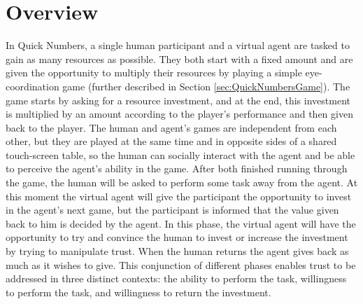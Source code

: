 \section{Overview}
\label{sec:ScenarioOverview}
In Quick Numbers, a single human participant and a virtual agent are tasked to gain as many resources as possible. They both start with a fixed amount and are given the opportunity to multiply their resources by playing a simple eye-coordination game (further described in Section \ref{sec:QuickNumbersGame}). The game starts by asking for a resource investment, and at the end, this investment is multiplied by an amount according to the player's performance and then given back to the player. The human and agent's games are independent from each other, but they are played at the same time and in opposite sides of a shared touch-screen table, so the human can socially interact with the agent and be able to perceive the agent's ability in the game. After both finished running through the game, the human will be asked to perform some task away from the agent. At this moment the virtual agent will give the participant the opportunity to invest in the agent's next game, but the participant is informed that the value given back to him is decided by the agent. In this phase, the virtual agent will have the opportunity to try and convince the human to invest or increase the investment by trying to manipulate trust. When the human returns the agent gives back as much as it wishes to give. This conjunction of different phases enables trust to be addressed in three distinct contexts: the ability to perform the task, willingness to perform the task, and willingness to return the investment. 

